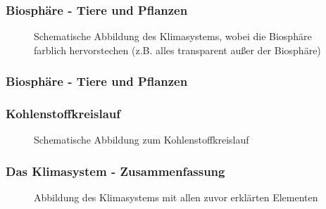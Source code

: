 \begin{frame}
	\frametitle{Biosphäre - Tiere und Pflanzen}
	
	\begin{figure}
		\caption{Schematische Abbildung des Klimasystems, wobei die Biosphäre farblich hervorstechen (z.B. alles transparent außer der Biosphäre)}
	\end{figure}
\end{frame}

\begin{frame}
	\frametitle{Biosphäre - Tiere und Pflanzen}

\end{frame}


\begin{frame}
	\frametitle{Kohlenstoffkreislauf}
	
	
	\begin{figure}
		\caption{Schematische Abbildung zum Kohlenstoffkreislauf}
	\end{figure}
	
\end{frame}

\begin{frame}
	\frametitle{Das Klimasystem - Zusammenfassung}
	
	\begin{figure}
		\caption{Abbildung des Klimasystems mit allen zuvor erklärten Elementen}
	\end{figure}
\end{frame}

%
%	



